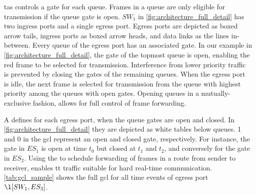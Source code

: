 \gls{tas} controls a gate for each queue.
Frames in a queue are only eligible for transmission if the queue gate is open.
$SW_1$ in \autoref{fig:architecture_full_detail} has two ingress ports and a single egress port.
Egress ports are depicted as boxed arrow tails, ingress ports as boxed arrow heads, and data links as the lines in-between.
Every queue of the egress port has an associated gate.
In our example in \autoref{fig:architecture_full_detail}, the gate of the topmost queue is open, enabling the red frame to be selected for transmission.
Interference from lower priority traffic is prevented by closing the gates of the remaining queues.
When the egress port is idle, the next frame is selected for transmission from the queue with highest priority among the queues with open gates.
Opening queues in a mutually-exclusive fashion, allows for full control of frame forwarding.

A  defines for each egress port, when the queue gates are open and closed.
In \autoref{fig:architecture_full_detail} they are depicted as white tables below queues. 1 and 0 in the \gls{gcl} represent an open and closed gate, respectively.
For instance, the gate in $ES_1$ is open at time $t_0$ but closed at $t_1$ and $t_2$, and conversely for the gate in $ES_2$.
Using the  to schedule forwarding of frames in a route from sender to receiver, enables \gls{tt} traffic suitable for hard real-time communication. \autoref{tab:gcl_sample} shows the full \gls{gcl} for all time events of egress port $\l[SW_1,ES_3]$.

